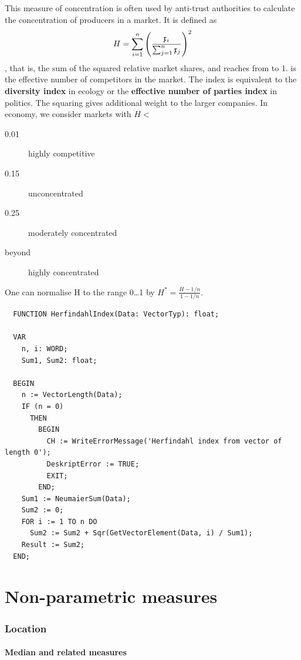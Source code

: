 \begin{refsection}
This measure of concentration is often used by anti-trust authorities to calculate the concentration of producers in a market. It is defined as
\begin{equation}
  H = \sum_{i=1}^n{\left( \frac{\mathfrak{x}_i}{\sum_{j=1}^n{\mathfrak{x}_j}} \right)^2}
\end{equation}
, that is, the sum of the squared relative market shares, and reaches from  to 1.  is the effective number of competitors in the market. The index is equivalent to the \textbf{ diversity index} in ecology or the \textbf{effective number of parties index} in politics. The squaring gives additional weight to the larger companies. In economy, we consider markets with \( H < \)
\begin{description}
  \item[0.01]{highly competitive}
  \item[0.15]{unconcentrated}
  \item[0.25]{moderately concentrated}
  \item[beyond]{highly concentrated}
\end{description}
One can normalise H to the range 0\ldots 1 by \( H^* = \frac{H - 1/n}{1 - 1/n} \).

\begin{lstlisting}
  FUNCTION HerfindahlIndex(Data: VectorTyp): float;

  VAR
    n, i: WORD;
    Sum1, Sum2: float;

  BEGIN
    n := VectorLength(Data);
    IF (n = 0)
      THEN
        BEGIN
          CH := WriteErrorMessage('Herfindahl index from vector of length 0');
          DeskriptError := TRUE;
          EXIT;
        END;
    Sum1 := NeumaierSum(Data);
    Sum2 := 0;
    FOR i := 1 TO n DO
      Sum2 := Sum2 + Sqr(GetVectorElement(Data, i) / Sum1);
    Result := Sum2;
  END;
\end{lstlisting}


\section{Non-parametric measures}

\subsubsection{Location}

\paragraph{Median and related measures}


\end{refsection}
